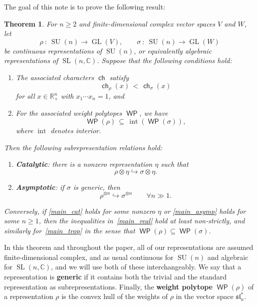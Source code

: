 \documentclass[11pt]{article}
\newtheorem{thm}[theo]{Theorem}
\theoremstyle{definition}
\numberwithin{equation}{section}
\newcommand{\R}{\mathbb{R}}
\newcommand{\C}{\mathbb{C}}
\DeclareMathOperator{\SU}{SU}
\DeclareMathOperator{\GL}{GL}
\DeclareMathOperator{\SL}{SL}
\DeclareMathOperator{\chr}{\mathsf{ch}}
\DeclareMathOperator{\WP}{\mathsf{WP}}
\DeclareMathOperator{\interior}{int}
\newcommand{\newterm}[1]{\textbf{#1}}
\begin{document}
The goal of this note is to prove the following result:

\begin{thm}
	\label{main}
	For $n \ge 2$ and finite-dimensional complex vector spaces $V$ and $W$, let
	\[
		\rho \: : \: \SU(n) \longrightarrow \GL(V), \qquad \sigma \: : \: \SU(n) \longrightarrow \GL(W)
	\]
	be continuous representations of $\SU(n)$, or equivalently algebraic representations of $\SL(n,\C)$.
	Suppose that the following conditions hold:
	\begin{enumerate}[label=(\roman*)]
		\item\label{main_real} The associated characters $\chr$ satisfy
			\begin{equation}
				\label{main_real_ineq}
				\chr_\rho(x) \,<\, \chr_\sigma(x)
			\end{equation}
			for all $x \in \R_+^n$ with $x_1 \cdots x_n = 1$, and
		\item\label{main_trop} For the associated weight polytopes $\WP$, we have
			\begin{equation}
				\label{main_trop_ineq}
				\WP(\rho) \,\subseteq\, \interior(\WP(\sigma)),
			\end{equation}
			where $\interior$ denotes interior.
	\end{enumerate}
	Then the following subrepresentation relations hold:
	\begin{enumerate}[label=(\alph*)]
		\item \newterm{Catalytic}: there is a nonzero representation $\eta$ such that
			\begin{equation}
				\label{main_cat}
				\rho \otimes \eta \hookrightarrow \sigma \otimes \eta.
			\end{equation}
		\item \newterm{Asymptotic}: if $\sigma$ is generic, then
			\begin{equation}
				\label{main_asymp}
				\rho^{\otimes n} \hookrightarrow \sigma^{\otimes n} \qquad \forall n \gg 1.
			\end{equation}
	\end{enumerate}
	Conversely, if \eqref{main_cat} holds for some nonzero $\eta$ or \eqref{main_asymp} holds for some $n \ge 1$, then the inequalities in~\ref{main_real} hold at least non-strictly, and similarly for~\ref{main_trop} in the sense that $\WP(\rho) \subseteq \WP(\sigma)$.
\end{thm}

In this theorem and throughout the paper, all of our representations are assumed finite-dimensional complex, and as usual continuous for $\SU(n)$ and algebraic for $\SL(n,\C)$, and we will use both of these interchangeably.
We say that a representation is \newterm{generic} if it contains both the trivial and the standard representation as subrepresentations.
Finally, the \newterm{weight polytope} $\WP(\rho)$ of a representation $\rho$ is the convex hull of the weights of $\rho$ in the vector space $\mathfrak{sl}_n^*$.
\end{document}
